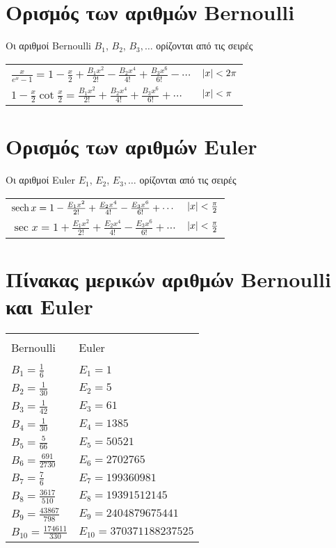 
\section{Ορισμός των αριθμών \textlatin{Bernoulli}}

Οι αριθμοί \textlatin{Bernoulli} $ B_{1} $, $ B_{2} $, $ B_{3}, \ldots $   
ορίζονται από τις σειρές

\begin{tabular}{ll}
	$ \frac{x}{e^{x} - 1} = 1 - \frac{x}{2} + \frac{B_{1} x^{2}}{2!} -
	\frac{B_{2} x^{4}}{4!} + \frac{B_{3} x^{6}}{6!} - \cdots $ & $ \abs{x} < 2
	\pi $ \\
	$ 1 - \frac{x}{2} \cot{\frac{x}{2}} = \frac{B_{1} x^{2}}{2!} +
	\frac{B_{2} x^{4}}{4!} + \frac{B_{3} x^{6}}{6!} + \cdots $ & $ \abs{x} < \pi $
\end{tabular}

\section{Ορισμός των αριθμών \textlatin{Euler}}

Οι αριθμοί \textlatin{Euler} $ E_{1} $, $ E_{2} $, $ E_{3}, \ldots $ ορίζονται
από τις σειρές

\begin{tabular}{ll}
	$ \sech{x} = 1 - \frac{E_{1} x^{2}}{2!} + \frac{E_{2} x^{4}}{4!} -
	\frac{E_{3} x^{6}}{6!} + \cdots $ & $ \abs{x} < \frac{\pi}{2} $ \\
	$ \sec{x} = 1 + \frac{E_{1} x^{2}}{2!} + \frac{E_{2} x^{4}}{4!} -
	\frac{E_{3} x^{6}}{6!} + \cdots $ & $ \abs{x} < \frac{\pi}{2}  $
\end{tabular}


\section{Πίνακας μερικών αριθμών \textlatin{Bernoulli} και \textlatin{Euler}}

\begin{tabular}{ll}
	\toprule \\
	\textlatin{Bernoulli} & \textlatin{Euler} \\
	\midrule \\
	$ B_{1} = \frac{1}{6} $ & $ E_{1} = 1 $ \\
	$ B_{2} = \frac{1}{30} $ & $ E_{2} = 5 $ \\
	$ B_{3} = \frac{1}{42} $ & $ E_{3} = 61 $ \\
	$ B_{4} = \frac{1}{30} $ & $ E_{4} = 1385 $ \\
	$ B_{5} = \frac{5}{66}  $ & $ E_{5} = 50521 $ \\
	$ B_{6} = \frac{691}{2730} $ & $ E_{6} = 2702765 $ \\
	$ B_{7} = \frac{7}{6} $ & $ E_{7} = 199360981 $ \\
	$ B_{8} = \frac{3617}{510} $ & $ E_{8} = 19391 512 145 $ \\
	$ B_{9} = \frac{43867}{798} $ & $ E_{9} = 2 404 879 675 441 $ \\
	$ B_{10} = \frac{174611}{330} $ & $ E_{10} = 370 371 188 237 525 $ \\
	\bottomrule
\end{tabular}


